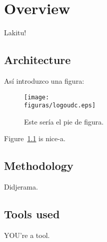 \chapter{Overview}

Lakitu!

\section{Architecture}

Así introduzco una figura:

\begin{figure}[H]
    \centerline{\texttt{[image: \\figuras/logoudc.eps]}}
    \label{fig:mifigura}\caption{Este sería el pie de figura.}
\end{figure}

Figure~\ref{fig:mifigura} is nice-a.

\section{Methodology}

Didjerama.

\section{Tools used}

YOU're a tool.